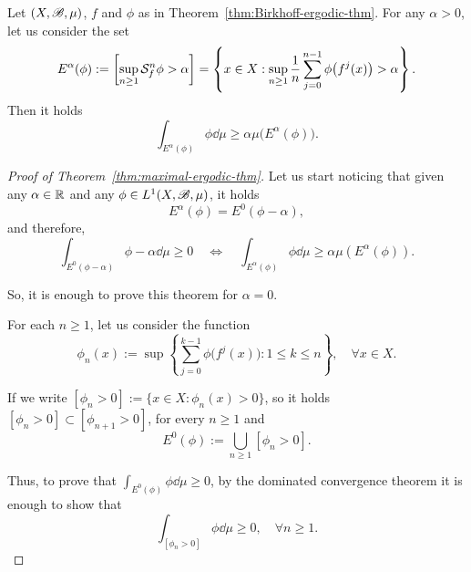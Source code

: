 \begin{theorem}\label{thm:maximal-ergodic-thm}
  Let $(X,\mathscr{B},\mu)$, $f$ and $\phi$ as in Theorem~\ref{thm:Birkhoff-ergodic-thm}. For any $\alpha>0$, let us consider the set
  \begin{displaymath}
    E^{\alpha}(\phi) := \left[\sup_{n\geq 1} \mathcal{S}_{f}^{n}\phi >\alpha\right] = \left\{x\in X : \sup_{n\geq 1} \frac{1}{n}\sum_{j=0}^{n-1}\phi\big(f^{j}(x)\big)>\alpha\right\}.
  \end{displaymath}
  Then it holds
  \begin{displaymath}
    \int_{E^{\alpha}(\phi)}\phi\dd\mu \geq \alpha\mu\big(E^{\alpha}(\phi)\big).
  \end{displaymath}
\end{theorem}

\begin{proof}[Proof of Theorem~\ref{thm:maximal-ergodic-thm}]
  Let us start noticing that given any $\alpha\in\mathbb{R}$ and any $\phi\in L^{1}(X,\mathscr{B},\mu)$, it holds
  \begin{displaymath}
    E^{\alpha}(\phi) = E^{0}(\phi-\alpha),
  \end{displaymath}
  and therefore,
  \begin{displaymath}
    \int_{E^{0}(\phi-\alpha)}\phi-\alpha\dd\mu \geq 0\quad \iff\quad \int_{E^{\alpha}(\phi)}\phi\dd\mu\geq \alpha\mu(E^{\alpha}(\phi)).
  \end{displaymath}

  So, it is enough to prove this theorem for $\alpha=0$.

  For each $n\geq 1$, let us consider the function
  \begin{displaymath}
    \phi_n(x):=\sup\left\{\sum_{j=0}^{k-1}\phi\big(f^j(x)\big) : 1\leq k\leq n\right\}, \quad\forall x\in X.
  \end{displaymath}

  If we write $[\phi_n>0]:=\{x\in X : \phi_n(x)>0\}$, so it holds $[\phi_n>0]\subset[\phi_{n+1}>0]$, for every $n\geq 1$ and
  \begin{displaymath}
    E^0(\phi):=\bigcup_{n\geq 1}[\phi_n>0].
  \end{displaymath}

  Thus, to prove that $\int_{E^{0}(\phi)}\phi\dd\mu\geq 0$, by the dominated convergence theorem it is enough to show that
  \begin{displaymath}
    \int_{[\phi_n>0]}\phi\dd\mu \geq 0, \quad\forall n\geq 1.
  \end{displaymath}


\end{proof}

